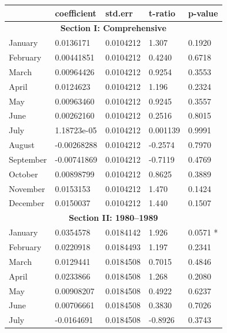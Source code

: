 \documentclass[11pt, english]{article}
\begin{document}
	\begin{center}
                \scriptsize
        \begin{longtable}{p{2cm}p{2cm}p{2cm}p{2cm}p{2cm}}
                & \textbf{coefficient} & \textbf{std.err} & \textbf{t-ratio} & \textbf{p-value}\\
                \hline
                \multicolumn{5}{c}{\textbf{Section I: Comprehensive}}\\
                \hline
                January & 0.0136171 & 0.0104212 & 1.307 & 0.1920\\
                February & 0.00441851 & 0.0104212 & 0.4240 & 0.6718\\
                March & 0.00964426 & 0.0104212 & 0.9254 & 0.3553\\
                April & 0.0124623 & 0.0104212 & 1.196 & 0.2324\\
                May & 0.00963460 & 0.0104212 & 0.9245 & 0.3557\\
                June & 0.00262160 & 0.0104212 & 0.2516 & 0.8015\\
                July & 1.18723e-05 & 0.0104212 & 0.001139 & 0.9991\\
                August & -0.00268288 & 0.0104212 & -0.2574 & 0.7970\\
                September & -0.00741869 & 0.0104212 & -0.7119 & 0.4769\\
                October & 0.00898799 & 0.0104212 & 0.8625 & 0.3889\\
                November & 0.0153153 & 0.0104212 & 1.470 & 0.1424\\
                December & 0.0150037 & 0.0104212 & 1.440 & 0.1507\\
                \hline
                \multicolumn{5}{c}{\textbf{Section II: 1980--1989}}\\
                \hline
                January & 0.0354578 & 0.0184142 & 1.926 & 0.0571 *\\   
                February & 0.0220918 & 0.0184493 & 1.197 & 0.2341\\
                March & 0.0129441 & 0.0184508 & 0.7015 & 0.4846\\
                April & 0.0233866 & 0.0184508 & 1.268 & 0.2080\\
                May & 0.00908207 & 0.0184508 & 0.4922 & 0.6237\\
                June & 0.00706661 & 0.0184508 & 0.3830 & 0.7026\\
                July & -0.0164691 & 0.0184508 & -0.8926 & 0.3743\\

\end{longtable}
\end{center}
\end{document}
